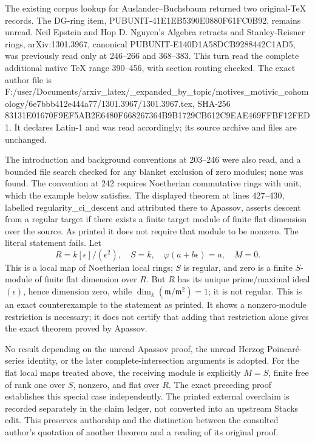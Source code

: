The existing corpus lookup for Auslander--Buchsbaum returned two original-TeX records. The DG-ring item, PUBUNIT-41E1EB5390E0880F61FC0B92, remains unread. Neil Epstein and Hop D. Nguyen's Algebra retracts and Stanley-Reisner rings, arXiv:1301.3967, canonical PUBUNIT-E140D1A58DCB9288442C1AD5, was previously read only at 246--266 and 368--383. This turn read the complete additional native TeX range 390--456, with section routing checked. The exact author file is F:\allowbreak{}/\allowbreak{}user/\allowbreak{}Documents/\allowbreak{}arxiv\_\allowbreak{}latex/\allowbreak{}\_\allowbreak{}expanded\_\allowbreak{}by\_\allowbreak{}topic/\allowbreak{}motives\_\allowbreak{}motivic\_\allowbreak{}cohomology/\allowbreak{}6e7bbb412e44\allowbreak{}4a77/\allowbreak{}1301.\allowbreak{}3967/\allowbreak{}1301.\allowbreak{}3967.\allowbreak{}tex, SHA-256 8313\allowbreak{}1E01\allowbreak{}670F\allowbreak{}9EF5\allowbreak{}AB2E\allowbreak{}6480\allowbreak{}F668\allowbreak{}2673\allowbreak{}64B9\allowbreak{}B172\allowbreak{}9CB6\allowbreak{}12C9\allowbreak{}EAE4\allowbreak{}69FF\allowbreak{}BF12\allowbreak{}FED1. It declares Latin-1 and was read accordingly; its source archive and files are unchanged.

The introduction and background conventions at 203--246 were also read, and a bounded file search checked for any blanket exclusion of zero modules; none was found. The convention at 242 requires Noetherian commutative rings with unit, which the example below satisfies. The displayed theorem at lines 427--430, labelled regularity\_ci\_descent and attributed there to Apassov, asserts descent from a regular target if there exists a finite target module of finite flat dimension over the source. As printed it does not require that module to be nonzero. The literal statement fails. Let \[
R=k[\epsilon]/(\epsilon^2),\quad S=k,\quad
\varphi(a+b\epsilon)=a,\quad M=0 .
\] This is a local map of Noetherian local rings; \(S\) is regular, and zero is a finite \(S\)-module of finite flat dimension over \(R\). But \(R\) has its unique prime/maximal ideal \((\epsilon)\), hence dimension zero, while \(\dim_k(\mathfrak m/\mathfrak m^2)=1\); it is not regular. This is an exact counterexample to the statement as printed. It shows a nonzero-module restriction is necessary; it does not certify that adding that restriction alone gives the exact theorem proved by Apassov.

No result depending on the unread Apassov proof, the unread Herzog Poincaré-series identity, or the later complete-intersection arguments is adopted. For the flat local maps treated above, the receiving module is explicitly \(M=S\), finite free of rank one over \(S\), nonzero, and flat over \(R\). The exact preceding proof establishes this special case independently. The printed external overclaim is recorded separately in the claim ledger, not converted into an upstream Stacks edit. This preserves authorship and the distinction between the consulted author's quotation of another theorem and a reading of its original proof.

